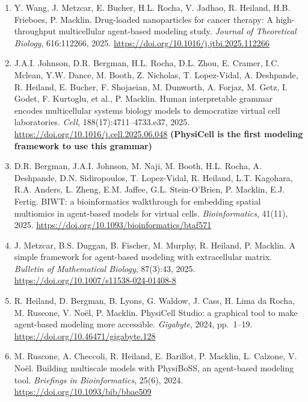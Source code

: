 \documentclass[11pt]{article}
\begin{document}
\begin{enumerate}[leftmargin=*, itemsep=3pt, topsep=4pt]
    \item Y. Wang, J. Metzcar, E. Bucher, H.L. Rocha, V. Jadhao, R. Heiland, H.B. Frieboes, P. Macklin. Drug-loaded nanoparticles for cancer therapy: A high-throughput multicellular agent-based modeling study. \textit{Journal of Theoretical Biology}, 616:112266, 2025. \url{https://doi.org/10.1016/j.jtbi.2025.112266}

    \item J.A.I. Johnson, D.R. Bergman, H.L. Rocha, D.L. Zhou, E. Cramer, I.C. Mclean, Y.W. Dance, M. Booth, Z. Nicholas, T. Lopez-Vidal, A. Deshpande, R. Heiland, E. Bucher, F. Shojaeian, M. Dunworth, A. Forjaz, M. Getz, I. Godet, F. Kurtoglu, et al., P. Macklin. Human interpretable grammar encodes multicellular systems biology models to democratize virtual cell laboratories. \textit{Cell}, 188(17):4711--4733.e37, 2025. \url{https://doi.org/10.1016/j.cell.2025.06.048} \newline \textbf{(PhysiCell is the first modeling framework to use this grammar)}

    \item D.R. Bergman, J.A.I. Johnson, M. Naji, M. Booth, H.L. Rocha, A. Deshpande, D.N. Sidiropoulos, T. Lopez-Vidal, R. Heiland, L.T. Kagohara, R.A. Anders, L. Zheng, E.M. Jaffee, G.L. Stein-O'Brien, P. Macklin, E.J. Fertig. BIWT: a bioinformatics walkthrough for embedding spatial multiomics in agent-based models for virtual cells. \textit{Bioinformatics}, 41(11), 2025. \url{https://doi.org/10.1093/bioinformatics/btaf571}

    \item J. Metzcar, B.S. Duggan, B. Fischer, M. Murphy, R. Heiland, P. Macklin. A simple framework for agent-based modeling with extracellular matrix. \textit{Bulletin of Mathematical Biology}, 87(3):43, 2025. \url{https://doi.org/10.1007/s11538-024-01408-8}

    \item R. Heiland, D. Bergman, B. Lyons, G. Waldow, J. Cass, H. Lima da Rocha, M. Ruscone, V. No\"el, P. Macklin. PhysiCell Studio: a graphical tool to make agent-based modeling more accessible. \textit{Gigabyte}, 2024, pp.\ 1--19. \url{https://doi.org/10.46471/gigabyte.128}

    \item M. Ruscone, A. Checcoli, R. Heiland, E. Barillot, P. Macklin, L. Calzone, V. No\"el. Building multiscale models with PhysiBoSS, an agent-based modeling tool. \textit{Briefings in Bioinformatics}, 25(6), 2024. \url{https://doi.org/10.1093/bib/bbae509}


\end{enumerate}
\end{document}
